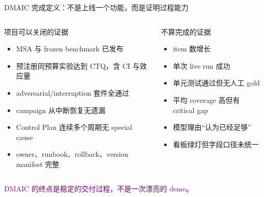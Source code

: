 \begin{frame}{DMAIC 完成定义：不是上线一个功能，而是证明过程能力}
\small
\begin{columns}[T,onlytextwidth]
\begin{exampleblock}{项目可以关闭的证据}
\begin{itemize}
  \item MSA 与 frozen benchmark 已发布
  \item 预注册同预算实验达到 CTQ，含 CI 与效应量
  \item adversarial/interruption 套件全通过
  \item campaign 从中断恢复无遗漏
  \item Control Plan 连续多个周期无 special cause
  \item owner、runbook、rollback、version manifest 完整
\end{itemize}
\end{exampleblock}
\begin{alertblock}{不算完成的证据}
\begin{itemize}
  \item item 数增长
  \item 单次 live run 成功
  \item 单元测试通过但无人工 gold
  \item 平均 coverage 高但有 critical gap
  \item 模型理由“认为已经足够”
  \item 看板绿灯但字段口径未统一
\end{itemize}
\end{alertblock}
\end{columns}

\vspace{0.2em}
\begin{center}
\large\textcolor{Purple}{DMAIC 的终点是稳定的交付过程，不是一次漂亮的 demo。}
\end{center}
\end{frame}
